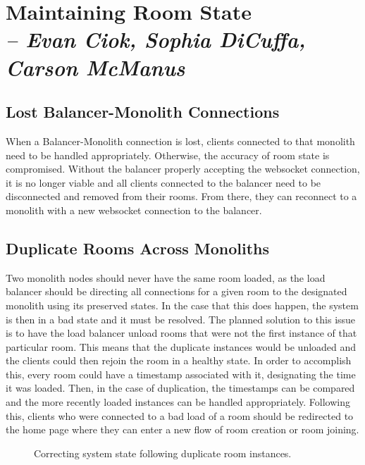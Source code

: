 \chapter{Maintaining Room State \\
  \small{\textit{-- Evan Ciok, Sophia DiCuffa, Carson McManus}}
  \label{Chapter::RoomState}}

\section{Lost Balancer-Monolith Connections}

When a Balancer-Monolith connection is lost, clients connected to that monolith need to be handled appropriately. Otherwise, the accuracy of room state is compromised. 
Without the balancer properly accepting the websocket connection, it is no longer viable and all clients connected to the balancer need to be disconnected and removed 
from their rooms. From there, they can reconnect to a monolith with a new websocket connection to the balancer. 

\section{Duplicate Rooms Across Monoliths}

Two monolith nodes should never have the same room loaded, as the load balancer should be directing all connections for a given room to the designated monolith using its preserved states. 
In the case that this does happen, the system is then in a bad state and it must be resolved. The planned solution to this issue is to have the load balancer unload rooms that were not the 
first instance of that particular room. This means that the duplicate instances would be unloaded and the clients could then rejoin the room in a healthy state. In order to accomplish this, 
every room could have a timestamp associated with it, designating the time it was loaded. Then, in the case of duplication, the timestamps can be compared and the more recently loaded 
instances can be handled appropriately. Following this, clients who were connected to a bad load of a room should be redirected to the home page where they can enter a new flow of room 
creation or room joining. 

\begin{figure}[!htb]
  \centering
  \caption{\label{Figure::duplicate-rooms} Correcting system state following duplicate room instances.}
\end{figure}